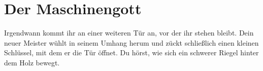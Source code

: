 \chapter*{Der Maschinengott}



Irgendwann kommt ihr an einer weiteren Tür an, vor der ihr stehen bleibt. Dein neuer Meister wühlt in seinem Umhang herum und zückt schließlich einen kleinen Schlüssel, mit dem er die Tür öffnet. Du hörst, wie sich ein schwerer Riegel hinter dem Holz bewegt.
